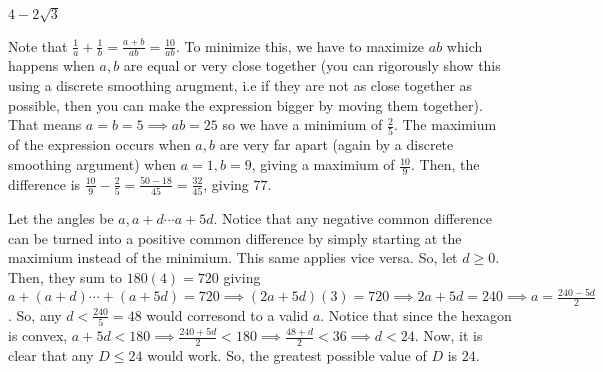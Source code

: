 \documentclass[11pt]{article}
\begin{document}
\begin{sol}
$\boxed{4-2\sqrt{3}}$
\end{sol}

\begin{sol}
Note that $\frac{1}{a}+\frac{1}{b}=\frac{a+b}{ab}=\frac{10}{ab}$. To minimize this, we have to maximize $ab$ which happens when $a,b$ are equal or very close together (you can rigorously show this using a discrete smoothing arugment, i.e if they are not as close together as possible, then you can make the expression bigger by moving them together). That means $a=b=5\implies ab=25$ so we have a minimium of $\frac{2}{5}$. The maximium of the expression occurs when $a,b$ are very far apart (again by a discrete smoothing argument) when $a=1, b=9$, giving a maximium of $\frac{10}{9}$. Then, the difference is $\frac{10}{9}-\frac{2}{5}=\frac{50-18}{45}=\frac{32}{45}$, giving $\boxed{77}$.
\end{sol}


\begin{sol}
Let the angles be $a,a+d\cdots a+5d$.  Notice that any negative common difference can be turned into a positive common difference by simply starting at the maximium instead of the minimium. This same applies vice versa. So, let $d\ge 0$. Then, they sum to $180(4)=720$ giving $a+(a+d)\cdots + (a+5d)=720\implies (2a+5d)(3)=720\implies 2a+5d=240\implies a =\frac{240-5d}{2}$. So, any $d<\frac{240}{5}=48$ would corresond to a valid $a$. Notice that since the hexagon is convex, $a+5d<180\implies \frac{240+5d}{2} < 180 \implies \frac{48+d}{2} < 36\implies d < 24$. Now, it is clear that any $D\leq 24$ would work. So, the greatest possible value of $D$ is $\boxed{24}$.
\end{sol}

\end{document}
